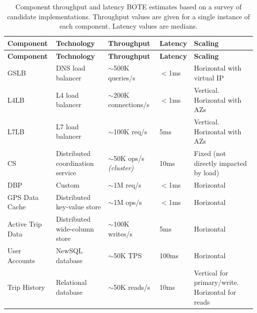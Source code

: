\documentclass[12pt]{article}
\begin{document}
\small
\begin{longtable}{@{}>{\raggedright\arraybackslash}p{2.3cm}>{\raggedright\arraybackslash}p{2.5cm}>{\raggedright\arraybackslash}p{2.8cm}>{\raggedright\arraybackslash}p{2.5cm}>{\raggedright\arraybackslash}p{4.5cm}@{}}
    \caption{Component throughput and latency BOTE estimates based on a survey of candidate implementations. Throughput values are given for a single instance of each component. Latency values are medians.}
    \label{tab:capacity}\\
    \toprule
    \textbf{Component} & \textbf{Technology} & \textbf{Throughput} & \textbf{Latency} & \textbf{Scaling}\\
    \midrule
    \endfirsthead
    \toprule
    \textbf{Component} & \textbf{Technology} & \textbf{Throughput} & \textbf{Latency} & \textbf{Scaling}\\
    \midrule
    \endhead
    \bottomrule
    \endlastfoot
    GSLB
        & DNS load balancer
        & $\sim$500K queries/s
        & $<$1ms
        & Horizontal with virtual IP \\
    \addlinespace
    L4LB
        & L4 load balancer
        & $\sim$200K connections/s
        & $<$1ms
        & Vertical. Horizontal with AZs \\
    \addlinespace
    L7LB
        & L7 load balancer
        & $\sim$100K req/s
        & 5ms
        & Vertical. Horizontal with AZs \\
    \addlinespace
    CS
        & Distributed coordination service
        & $\sim$50K ops/s \textit{(cluster)}
        & 10ms
        & Fixed (not directly impacted by load) \\
    \addlinespace
    DBP
        & Custom
        & $\sim$1M req/s
        & $<$1ms
        & Horizontal \\
    \addlinespace
    GPS Data Cache
        & Distributed key-value store
        & $\sim$1M ops/s
        & $<$1ms
        & Horizontal \\
    \addlinespace
    Active Trip Data
        & Distributed wide-column store
        & $\sim$100K writes/s
        & 5ms
        & Horizontal \\
    \addlinespace
    User Accounts
        & NewSQL database
        & $\sim$50K TPS
        & 100ms
        & Horizontal \\
    \addlinespace
    Trip History
        & Relational database
        & $\sim$50K reads/s
        & 10ms
        & Vertical for primary/write. Horizontal for reads \\
\end{longtable}
\normalsize
\end{document}
